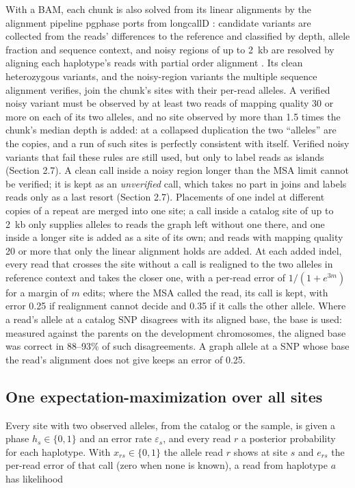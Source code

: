 With a BAM, each chunk is also solved from its linear alignments by the alignment pipeline pgphase ports from longcallD \citep{Gao2026}: candidate variants are collected from the reads' differences to the reference and classified by depth, allele fraction and sequence context, and noisy regions of up to 2~kb are resolved by aligning each haplotype's reads with partial order alignment \citep{Gao2021}. Its clean heterozygous variants, and the noisy-region variants the multiple sequence alignment verifies, join the chunk's sites with their per-read alleles. A verified noisy variant must be observed by at least two reads of mapping quality 30 or more on each of its two alleles, and no site observed by more than 1.5 times the chunk's median depth is added: at a collapsed duplication the two ``alleles'' are the copies, and a run of such sites is perfectly consistent with itself. Verified noisy variants that fail these rules are still used, but only to label reads as islands (Section 2.7). A clean call inside a noisy region longer than the MSA limit cannot be verified; it is kept as an \emph{unverified} call, which takes no part in joins and labels reads only as a last resort (Section 2.7). Placements of one indel at different copies of a repeat are merged into one site; a call inside a catalog site of up to 2~kb only supplies alleles to reads the graph left without one there, and one inside a longer site is added as a site of its own; and reads with mapping quality 20 or more that only the linear alignment holds are added. At each added indel, every read that crosses the site without a call is realigned to the two alleles in reference context and takes the closer one, with a per-read error of \(1/(1+e^{3m})\) for a margin of \(m\) edits; where the MSA called the read, its call is kept, with error 0.25 if realignment cannot decide and 0.35 if it calls the other allele. Where a read's allele at a catalog SNP disagrees with its aligned base, the base is used: measured against the parents on the development chromosomes, the aligned base was correct in 88--93\% of such disagreements. A graph allele at a SNP whose base the read's alignment does not give keeps an error of 0.25.

\subsection{One expectation-maximization over all sites}

Every site with two observed alleles, from the catalog or the sample, is given a phase \(h_s\in\{0,1\}\) and an error rate \(\varepsilon_s\), and every read \(r\) a posterior probability for each haplotype. With \(x_{rs}\in\{0,1\}\) the allele read \(r\) shows at site \(s\) and \(e_{rs}\) the per-read error of that call (zero when none is known), a read from haplotype \(a\) has likelihood

